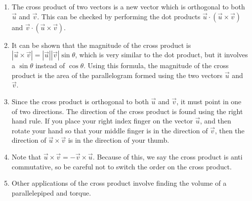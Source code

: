\begin{enumerate}
\item
The cross product of two vectors is a new vector which is orthogonal
to both $\vec u$ and $\vec v$. This can be checked by performing the
dot products $\vec u \cdot (\vec u \times \vec v)$ and $\vec v \cdot (\vec u \times \vec
v)$. 

\item

It can be shown that the magnitude of the cross product is {$|\vec u \times
\vec v| = |\vec u||\vec v|\sin\theta$}, which is very similar to the dot
product, but it involves a $\sin\theta$ instead of $\cos\theta$. Using this
formula, the magnitude of the cross product is the area of the
parallelogram formed using the two vectors $\vec u$ and $\vec v$.

\begin{center}
\end{center}

\item Since the cross product is orthogonal to both $\vec u$ and $\vec
v$, it must point in one of two directions. The direction of the cross
product is found using the right hand rule. If you place your right
index finger on the vector $\vec u$, and then rotate your hand so that
your middle finger is in the direction of $\vec v$, then the direction
of $\vec u\times\vec v$ is in the direction of your thumb. 

\item Note that {$\vec u\times \vec v = - \vec v\times \vec u$}. Because of
this, we say the cross product is anti commutative, so be careful not
to switch the order on the cross product. 

\item Other applications of the cross product involve finding the
volume of a parallelepiped and torque.

\end{enumerate}

